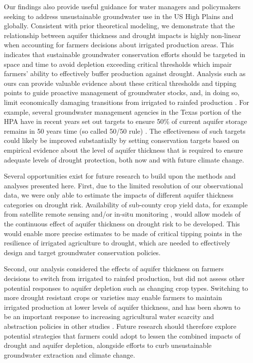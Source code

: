\documentclass[
]{article}
\begin{document}
Our findings also provide useful guidance for water managers and policymakers seeking to address unsustainable groundwater use in the US High Plains and globally. Consistent with prior theoretical modeling, we demonstrate that the relationship between aquifer thickness and drought impacts is highly non-linear when accounting for farmers decisions about irrigated production areas. This indicates that sustainable groundwater conservation efforts \citep{macewan2017hydroecon,butler2020charting,elshall2020groundwater} should be targeted in space and time to avoid depletion exceeding critical thresholds which impair farmers' ability to effectively buffer production against drought. Analysis such as ours can provide valuable evidence about these critical thresholds and tipping points to guide proactive management of groundwater stocks, and, in doing so, limit economically damaging transitions from irrigated to rainfed production \citep{foster2017effects,deines2020transitions}. For example, several groundwater management agencies in the Texas portion of the HPA have in recent years set out targets to ensure  50\% of current aquifer storage remains in 50 years time (so called 50/50 rule) \citep{closas2018chronicle}. The effectiveness of such targets could likely be improved substantially by setting conservation targets based on empirical evidence about the level of aquifer thickness that is required to ensure adequate levels of drought protection, both now and with future climate change. 

Several opportunities exist for future research to build upon the methods and analyses presented here. First, due to the limited resolution of our observational data, we were only able to estimate the impacts of different aquifer thickness categories on drought risk. Availability of sub-county crop yield data, for example from satellite remote sensing and/or in-situ monitoring \citep{edreira2020combining,deines2021million}, would allow models of the continuous effect of aquifer thickness on drought risk to be developed. This would enable more precise estimates to be made of critical tipping points in the resilience of irrigated agriculture to drought, which are needed to effectively design and target groundwater conservation policies. 

Second, our analysis considered the effects of aquifer thickness on farmers decisions to switch from irrigated to rainfed production, but did not assess other potential responses to aquifer depletion such as changing crop types. Switching to more drought resistant crops or varieties may enable farmers to maintain irrigated production at lower levels of aquifer thickness, and has been shown to be an important response to increasing agricultural water scarcity and abstraction policies in other studies \citep{bhattarai2021impact,deines2019quantifying,manning2017producer}. Future research should therefore explore potential strategies that farmers could adopt to lessen the combined impacts of drought and aquifer depletion, alongside efforts to curb unsustainable groundwater extraction and climate change. 
\end{document}
